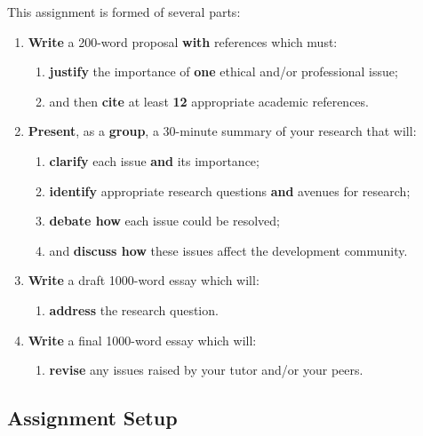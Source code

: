 \documentclass{../fal_assignment}
\newcommand{\proposalWordCount}{200}
\newcommand{\essayWordCount}{1000}
\newcommand{\presentationMinutes}{30}
\newcommand{\minReferenceCount}{12 }
\begin{document}
This assignment is formed of several parts:

\begin{enumerate}[label=(\Alph*)]
    \item \textbf{Write} a \proposalWordCount-word proposal \textbf{with} references which must:
    	\begin{enumerate}[label=\roman*.]
    		\item \textbf{justify} the importance of \textbf{one} ethical and/or professional issue;
    		\item and then \textbf{cite} at least \textbf{\minReferenceCount} appropriate academic references.
	\end{enumerate}
    \item \textbf{Present}, as a \textbf{group}, a \presentationMinutes-minute summary of your research that will:
    	\begin{enumerate}[label=\roman*.]
    		\item \textbf{clarify} each issue \textbf{and} its importance;
    		\item \textbf{identify} appropriate research questions \textbf{and} avenues for research;
    		\item \textbf{debate how} each issue could be resolved;
    		\item and \textbf{discuss how} these issues affect the development community.
	\end{enumerate}
    \item \textbf{Write} a draft \essayWordCount-word essay which will:
    	\begin{enumerate}[label=\roman*.]
    		\item  \textbf{address} the research question.
	\end{enumerate}
    \item \textbf{Write} a final \essayWordCount-word essay which will:
    	\begin{enumerate}[label=\roman*.]
    		\item \textbf{revise} any issues raised by your tutor and/or your peers.
	\end{enumerate}
\end{enumerate}


\subsection*{Assignment Setup}
\end{document}
